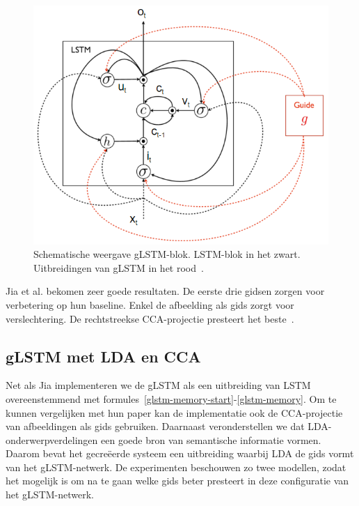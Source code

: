 \begin{figure}[tb]
	\centering
	\includegraphics[width=\linewidth]{Images/jia}
	\caption[Schematische weergave gLSTM-blok]{Schematische weergave gLSTM-blok. LSTM-blok in het zwart. Uitbreidingen van gLSTM in het rood~\cite{Fernando2015}.}
	\label{fig:glstm}
\end{figure}

Jia et al. bekomen zeer goede resultaten. De eerste drie gidsen zorgen voor verbetering op hun baseline. Enkel de afbeelding als gids zorgt voor verslechtering. De rechtstreekse CCA-projectie presteert het beste~\cite{Fernando2015}.

\subsection{gLSTM met LDA en CCA}
Net als Jia implementeren we de gLSTM als een uitbreiding van LSTM overeenstemmend met formules~\eqref{glstm-memory-start}-\eqref{glstm-memory}.
Om te kunnen vergelijken met hun paper kan de implementatie ook de CCA-projectie van afbeeldingen als gids gebruiken.
Daarnaast veronderstellen we dat LDA-onderwerpverdelingen een goede bron van semantische informatie vormen. Daarom bevat het gecre\"eerde systeem een uitbreiding waarbij LDA de gids vormt van het gLSTM-netwerk.
De experimenten beschouwen zo twee modellen, zodat het mogelijk is om na te gaan welke gids beter presteert in deze configuratie van het gLSTM-netwerk.

